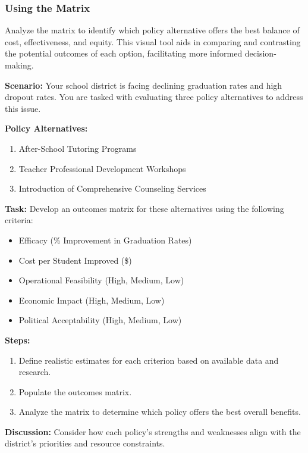 \documentclass{article}
\theoremstyle{definition}
\theoremstyle{plain}
\begin{document}
\subsubsection{Using the Matrix}

Analyze the matrix to identify which policy alternative offers the best balance of cost, effectiveness, and equity. This visual tool aids in comparing and contrasting the potential outcomes of each option, facilitating more informed decision-making.

\begin{tcolorbox}[colback=blue!5!white, colframe=blue!75!black, title=Exercise: Developing an Outcomes Matrix]
\textbf{Scenario:} Your school district is facing declining graduation rates and high dropout rates. You are tasked with evaluating three policy alternatives to address this issue.

\textbf{Policy Alternatives:}
\begin{enumerate}[label=\alph*.]
    \item After-School Tutoring Programs
    \item Teacher Professional Development Workshops
    \item Introduction of Comprehensive Counseling Services
\end{enumerate}

\textbf{Task:} Develop an outcomes matrix for these alternatives using the following criteria:
\begin{itemize}
    \item Efficacy (\% Improvement in Graduation Rates)
    \item Cost per Student Improved (\$)
    \item Operational Feasibility (High, Medium, Low)
    \item Economic Impact (High, Medium, Low)
    \item Political Acceptability (High, Medium, Low)
\end{itemize}

\textbf{Steps:}
\begin{enumerate}[label=\alph*.]
    \item Define realistic estimates for each criterion based on available data and research.
    \item Populate the outcomes matrix.
    \item Analyze the matrix to determine which policy offers the best overall benefits.
\end{enumerate}

\textbf{Discussion:} Consider how each policy's strengths and weaknesses align with the district's priorities and resource constraints.
\end{tcolorbox}
\end{document}
